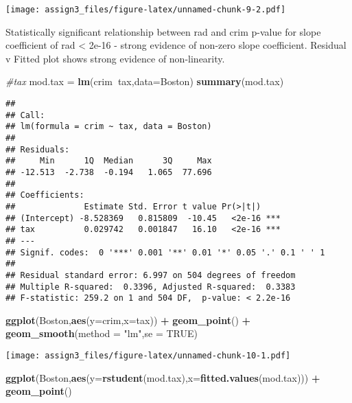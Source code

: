 \documentclass[]{article}
\newenvironment{Shaded}{\begin{snugshade}}{\end{snugshade}}
\newcommand{\CommentTok}[1]{\textcolor[rgb]{0.56,0.35,0.01}{\textit{#1}}}
\newcommand{\DataTypeTok}[1]{\textcolor[rgb]{0.13,0.29,0.53}{#1}}
\newcommand{\KeywordTok}[1]{\textcolor[rgb]{0.13,0.29,0.53}{\textbf{#1}}}
\newcommand{\NormalTok}[1]{#1}
\newcommand{\OperatorTok}[1]{\textcolor[rgb]{0.81,0.36,0.00}{\textbf{#1}}}
\newcommand{\OtherTok}[1]{\textcolor[rgb]{0.56,0.35,0.01}{#1}}
\newcommand{\StringTok}[1]{\textcolor[rgb]{0.31,0.60,0.02}{#1}}
\begin{document}
\texttt{[image: assign3\_files/figure-latex/unnamed-chunk-9-2.pdf]}

Statistically significant relationship between rad and crim p-value for
slope coefficient of rad \textless{} 2e-16 - strong evidence of non-zero
slope coefficient. Residual v Fitted plot shows strong evidence of
non-linearity.

\begin{Shaded}
\begin{Highlighting}[]
\CommentTok{#tax}
\NormalTok{mod.tax =}\StringTok{ }\KeywordTok{lm}\NormalTok{(crim}\OperatorTok{~}\NormalTok{tax,}\DataTypeTok{data=}\NormalTok{Boston)}
\KeywordTok{summary}\NormalTok{(mod.tax)}
\end{Highlighting}
\end{Shaded}

\begin{verbatim}
## 
## Call:
## lm(formula = crim ~ tax, data = Boston)
## 
## Residuals:
##     Min      1Q  Median      3Q     Max 
## -12.513  -2.738  -0.194   1.065  77.696 
## 
## Coefficients:
##              Estimate Std. Error t value Pr(>|t|)    
## (Intercept) -8.528369   0.815809  -10.45   <2e-16 ***
## tax          0.029742   0.001847   16.10   <2e-16 ***
## ---
## Signif. codes:  0 '***' 0.001 '**' 0.01 '*' 0.05 '.' 0.1 ' ' 1
## 
## Residual standard error: 6.997 on 504 degrees of freedom
## Multiple R-squared:  0.3396, Adjusted R-squared:  0.3383 
## F-statistic: 259.2 on 1 and 504 DF,  p-value: < 2.2e-16
\end{verbatim}

\begin{Shaded}
\begin{Highlighting}[]
\KeywordTok{ggplot}\NormalTok{(Boston,}\KeywordTok{aes}\NormalTok{(}\DataTypeTok{y=}\NormalTok{crim,}\DataTypeTok{x=}\NormalTok{tax)) }\OperatorTok{+}\StringTok{ }\KeywordTok{geom_point}\NormalTok{() }\OperatorTok{+}\StringTok{ }\KeywordTok{geom_smooth}\NormalTok{(}\DataTypeTok{method =} \StringTok{"lm"}\NormalTok{,}\DataTypeTok{se =} \OtherTok{TRUE}\NormalTok{)}
\end{Highlighting}
\end{Shaded}

\texttt{[image: assign3\_files/figure-latex/unnamed-chunk-10-1.pdf]}

\begin{Shaded}
\begin{Highlighting}[]
\KeywordTok{ggplot}\NormalTok{(Boston,}\KeywordTok{aes}\NormalTok{(}\DataTypeTok{y=}\KeywordTok{rstudent}\NormalTok{(mod.tax),}\DataTypeTok{x=}\KeywordTok{fitted.values}\NormalTok{(mod.tax))) }\OperatorTok{+}\StringTok{ }\KeywordTok{geom_point}\NormalTok{() }
\end{Highlighting}
\end{Shaded}
\end{document}
